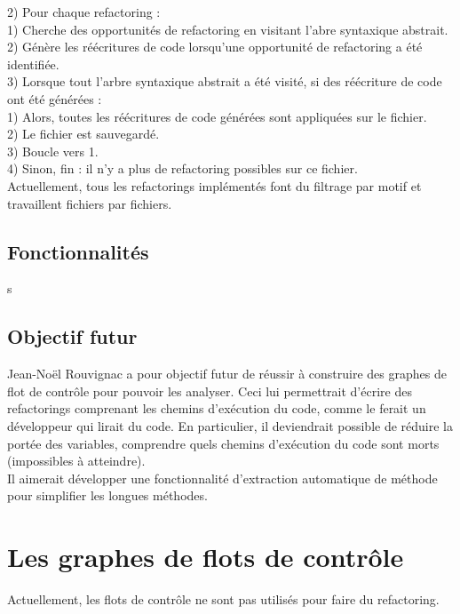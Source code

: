 \documentclass[a4paper,twoside,12pt,openright]{report}
\begin{document}
2) Pour chaque refactoring :\\
\tabto{0.8cm} 1) Cherche des opportunités de refactoring en visitant l'abre syntaxique abstrait.\\
\tabto{0.8cm} 2) Génère les réécritures de code lorsqu'une  opportunité de refactoring a été identifiée.\\

3) Lorsque tout l'arbre syntaxique abstrait a été visité, si des réécriture de code ont été générées :\\
\tabto{0.8cm} 1) Alors, toutes les réécritures de code générées sont appliquées sur le fichier.\\
\tabto{0.8cm} 2) Le fichier est sauvegardé.\\
\tabto{0.8cm} 3) Boucle vers 1.\\
\tabto{0.8cm} 4) Sinon, fin : il n'y a plus de refactoring possibles sur ce fichier.\\

Actuellement, tous les refactorings implémentés font du filtrage par motif et travaillent fichiers par fichiers.
\subsection{Fonctionnalités}
s

\subsection{Objectif futur}
Jean-Noël Rouvignac a pour objectif futur de réussir à construire des graphes de flot de contrôle pour pouvoir les analyser. Ceci lui permettrait d'écrire des refactorings comprenant les chemins d'exécution du code, comme le ferait un développeur qui lirait du code. En particulier, il deviendrait possible de réduire la portée des variables, comprendre quels chemins d'exécution du code sont morts (impossibles à atteindre).\cite{ref7}\\
Il aimerait développer une fonctionnalité d'extraction automatique de méthode pour simplifier les longues méthodes.



\section{Les graphes de flots de contrôle}
Actuellement, les flots de contrôle ne sont pas utilisés pour faire du refactoring.







\end{document}
